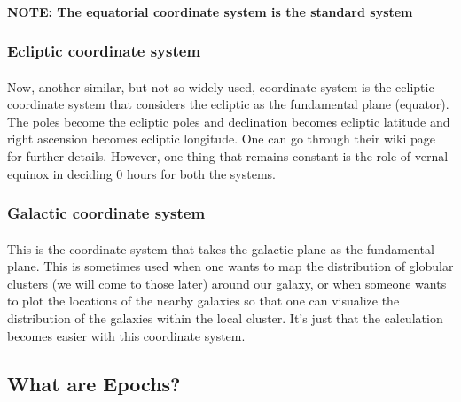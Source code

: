 \documentclass[a4paper,twoside]{article}
\numberwithin{equation}{section}
\begin{document}
\paragraph{NOTE: The equatorial coordinate system is the standard system}
\subsubsection{Ecliptic coordinate system}
\paragraph{}
Now, another similar, but not so widely used, coordinate system is the ecliptic coordinate system that considers the ecliptic as the fundamental plane (equator). The poles become the ecliptic poles and declination becomes ecliptic latitude and right ascension becomes ecliptic longitude. One can go through their wiki page for further details. However, one thing that remains constant is the role of vernal equinox in deciding 0 hours for both the systems.
\subsubsection{Galactic coordinate system}
\paragraph{}
This is the coordinate system that takes the galactic plane as the fundamental plane. This is sometimes used when one wants to map the distribution of globular clusters (we will come to those later) around our galaxy, or when someone wants to plot the locations of the nearby galaxies so that one can visualize the distribution of the galaxies within the local cluster. It's just that the calculation becomes easier with this coordinate system.
\subsection{What are Epochs?}
\end{document}
